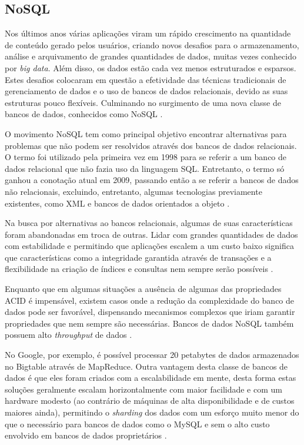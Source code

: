 \documentclass[diss]{template/setrem}
\begin{document}
\subsection{NoSQL}
Nos últimos anos várias aplicações viram um rápido crescimento na quantidade de conteúdo gerado pelos usuários, criando novos desafios para o armazenamento, análise e arquivamento de grandes quantidades de dados, muitas vezes conhecido por \emph{big data}. Além disso, os dados estão cada vez menos estruturados e esparsos. Estes desafios colocaram em questão a efetividade das técnicas tradicionais de gerenciamento de dados e o uso de bancos de dados relacionais, devido as suas estruturas pouco flexíveis. Culminando no surgimento de uma nova classe de bancos de dados, conhecidos como NoSQL \citep{Tiwari2011}.

O movimento NoSQL tem como principal objetivo encontrar alternativas para problemas que não podem ser resolvidos através dos bancos de dados relacionais. O termo foi utilizado pela primeira vez em 1998 para se referir a um banco de dados relacional que não fazia uso da linguagem SQL. Entretanto, o termo só ganhou a conotação atual em 2009, passando então a se referir a bancos de dados não relacionais, excluindo, entretanto, algumas tecnologias previamente existentes, como XML e bancos de dados orientados a objeto \citep{Strauch2011}.

Na busca por alternativas ao bancos relacionais, algumas de suas características foram abandonadas em troca de outras. Lidar com grandes quantidades de dados com estabilidade e permitindo que aplicações escalem a um custo baixo significa que características como a integridade garantida através de transações e a flexibilidade na criação de índices e consultas nem sempre serão possíveis \citep{Tiwari2011}.

Enquanto que em algumas situações a ausência de algumas das propriedades ACID é impensável, existem casos onde a redução da complexidade do banco de dados pode ser favorável, dispensando mecanismos complexos que iriam garantir propriedades que nem sempre são necessárias. Bancos de dados NoSQL também possuem alto \emph{throughput} de dados \citep{Strauch2011}.

No Google, por exemplo, é possível processar 20 petabytes de dados armazenados no Bigtable através de MapReduce. Outra vantagem desta classe de bancos de dados é que eles foram criados com a escalabilidade em mente, desta forma estas soluções geralmente escalam horizontalmente com maior facilidade e com um hardware modesto (ao contrário de máquinas de alta disponibilidade e de custos maiores ainda), permitindo o \emph{sharding} dos dados com um esforço muito menor do que o necessário para bancos de dados como o MySQL e sem o alto custo envolvido em bancos de dados proprietários \citep{Strauch2011}.
\end{document}

